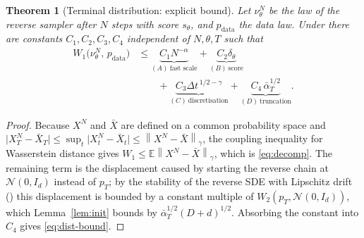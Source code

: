 \documentclass[a4paper,fleqn]{cas-dc}
\newtheorem{theorem}{Theorem}[section]
\theoremstyle{definition}
\newcommand{\E}{\mathbb{E}}
\newcommand{\norm}[1]{\left\lVert#1\right\rVert}
\newcommand{\holder}[1]{\norm{#1}_{\gamma}}
\begin{document}
\begin{theorem}[Terminal distribution: explicit bound]
\label{thm:dist}
Let $\nu^{N}_{\theta}$ be the law of the reverse sampler after $N$ steps with
score $s_{\theta}$, and $p_{\mathrm{data}}$ the data law. Under
 there are constants
$C_{1},C_{2},C_{3},C_{4}$ independent of $N,\theta,T$ such that
\begin{equation}
\begin{split}
W_{1}\bigl(\nu^{N}_{\theta},\,p_{\mathrm{data}}\bigr)
&\le
\underbrace{C_{1}N^{-\alpha}}_{(A)\ \text{fast scale}}
+\underbrace{C_{2}\delta_{\theta}}_{(B)\ \text{score}}\\
&\qquad
+\underbrace{C_{3}\Delta t^{\,1/2-\gamma}}_{(C)\ \text{discretisation}}
+\underbrace{C_{4}\,\bar\alpha_{T}^{1/2}}_{(D)\ \text{truncation}} .
\end{split}
\label{eq:dist-bound}
\end{equation}
\end{theorem}

\begin{proof}
Because $X^{N}$ and $\bar X$ are defined on a common probability space and
$\lvert X^{N}_{T}-\bar X_{T}\rvert\le\sup_{t}\lvert X^{N}_{t}-\bar X_{t}\rvert
\le\holder{X^{N}-\bar X}$, the coupling inequality for Wasserstein distance gives
$W_{1}\le\E\holder{X^{N}-\bar X}$, which is \eqref{eq:decomp}. The remaining term
is the displacement caused by starting the reverse chain at
$\mathcal{N}(0,I_{d})$ instead of $p_{T}$; by the stability of the reverse SDE
with Lipschitz drift () this displacement is bounded by a
constant multiple of $W_{2}(p_{T},\mathcal{N}(0,I_{d}))$, which
Lemma~\ref{lem:init} bounds by $\bar\alpha_{T}^{1/2}(D+d)^{1/2}$. Absorbing the
constant into $C_{4}$ gives \eqref{eq:dist-bound}.
\end{proof}
\end{document}
